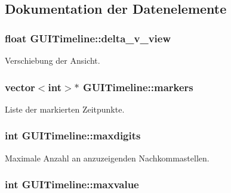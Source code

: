\subsection{Dokumentation der Datenelemente}
\hypertarget{classGUITimeline_aba3c330e3e9e5f2f5edb069ecbb9c488}{
\subsubsection[{delta\-\_\-v\-\_\-view}]{\setlength{\rightskip}{0pt plus 5cm}float G\-U\-I\-Timeline\-::delta\-\_\-v\-\_\-view\hspace{0.3cm}{\ttfamily [private]}}}\label{classGUITimeline_aba3c330e3e9e5f2f5edb069ecbb9c488}
Verschiebung der Ansicht. \hypertarget{classGUITimeline_a8e20b6ed00d7c48716256fffdcfa608a}{
\subsubsection[{markers}]{\setlength{\rightskip}{0pt plus 5cm}vector$<$int$>$$\ast$ G\-U\-I\-Timeline\-::markers\hspace{0.3cm}{\ttfamily [private]}}}\label{classGUITimeline_a8e20b6ed00d7c48716256fffdcfa608a}
Liste der markierten Zeitpunkte. \hypertarget{classGUITimeline_a880c85a1838b77e7dd2c03601c15e36b}{
\subsubsection[{maxdigits}]{\setlength{\rightskip}{0pt plus 5cm}int G\-U\-I\-Timeline\-::maxdigits\hspace{0.3cm}{\ttfamily [private]}}}\label{classGUITimeline_a880c85a1838b77e7dd2c03601c15e36b}
Maximale Anzahl an anzuzeigenden Nachkommastellen. \hypertarget{classGUITimeline_a6c639803db9c5afff38d3221242da912}{
\subsubsection[{maxvalue}]{\setlength{\rightskip}{0pt plus 5cm}int G\-U\-I\-Timeline\-::maxvalue\hspace{0.3cm}{\ttfamily [private]}}}\label{classGUITimeline_a6c639803db9c5afff38d3221242da912}
